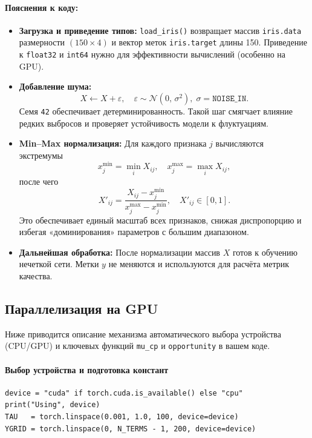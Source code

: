 \paragraph{Пояснения к коду:}
\begin{itemize}
  \item \textbf{Загрузка и приведение типов:}  
    \verb|load_iris()| возвращает массив \verb|iris.data| размерности $(150\times4)$ и вектор меток \verb|iris.target| длины 150.  
    Приведение к \verb|float32| и \verb|int64| нужно для эффективности вычислений (особенно на GPU).
  
  \item \textbf{Добавление шума:}
    \[
      X \leftarrow X + \varepsilon,\quad \varepsilon \sim \mathcal{N}(0,\,\sigma^2),\;
      \sigma=\texttt{NOISE\_IN}.
    \]
    Семя \verb|42| обеспечивает детерминированность. Такой шаг смягчает влияние редких выбросов и проверяет устойчивость модели к флуктуациям.
  
  \item \textbf{Min–Max нормализация:}  
    Для каждого признака $j$ вычисляются экстремумы
    \[
      x_j^{\min} = \min_i X_{ij}, \quad
      x_j^{\max} = \max_i X_{ij},
    \]
    после чего
    \[
      X'_{ij} = \frac{X_{ij} - x_j^{\min}}{x_j^{\max} - x_j^{\min}},\quad
      X'_{ij}\in[0,1].
    \]
    Это обеспечивает единый масштаб всех признаков, снижая диспропорцию и избегая «доминирования» параметров с большим диапазоном.
  
  \item \textbf{Дальнейшая обработка:}  
    После нормализации массив $X$ готов к обучению нечеткой сети. Метки $y$ не меняются и используются для расчёта метрик качества.
\end{itemize}

\subsection{Параллелизация на GPU}

Ниже приводится описание механизма автоматического выбора устройства (CPU/GPU) и ключевых функций \verb|mu_cp| и \verb|opportunity| в вашем коде.

\paragraph{Выбор устройства и подготовка констант}
\begin{verbatim}
device = "cuda" if torch.cuda.is_available() else "cpu"
print("Using", device)
TAU   = torch.linspace(0.001, 1.0, 100, device=device)
YGRID = torch.linspace(0, N_TERMS - 1, 200, device=device)
\end{verbatim}


